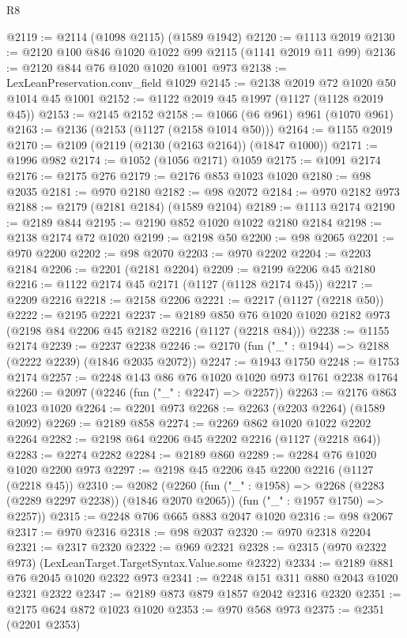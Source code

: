 \begin{lexlean}{R8}
\begin{coremodule}
@2119 := @2114 (@1098 @2115) (@1589 @1942)
@2120 := @1113 @2019
@2130 := @2120 @100 @846 @1020 @1022 @99 @2115 (@1141 @2019 @11 @99)
@2136 := @2120 @844 @76 @1020 @1020 @1001 @973
@2138 := LexLeanPreservation.conv_field @1029
@2145 := @2138 @2019 @72 @1020 @50 @1014 @45 @1001
@2152 := @1122 @2019 @45 @1997 (@1127 (@1128 @2019 @45))
@2153 := @2145 @2152
@2158 := @1066 (@6 @961) @961 (@1070 @961)
@2163 := @2136 (@2153 (@1127 (@2158 @1014 @50)))
@2164 := @1155 @2019
@2170 := @2109 (@2119 (@2130 (@2163 @2164)) (@1847 @1000))
@2171 := @1996 @982
@2174 := @1052 (@1056 @2171) @1059
@2175 := @1091 @2174
@2176 := @2175 @276
@2179 := @2176 @853 @1023 @1020
@2180 := @98 @2035
@2181 := @970 @2180
@2182 := @98 @2072
@2184 := @970 @2182 @973
@2188 := @2179 (@2181 @2184) (@1589 @2104)
@2189 := @1113 @2174
@2190 := @2189 @844
@2195 := @2190 @852 @1020 @1022 @2180 @2184
@2198 := @2138 @2174 @72 @1020
@2199 := @2198 @50
@2200 := @98 @2065
@2201 := @970 @2200
@2202 := @98 @2070
@2203 := @970 @2202
@2204 := @2203 @2184
@2206 := @2201 (@2181 @2204)
@2209 := @2199 @2206 @45 @2180
@2216 := @1122 @2174 @45 @2171 (@1127 (@1128 @2174 @45))
@2217 := @2209 @2216
@2218 := @2158 @2206
@2221 := @2217 (@1127 (@2218 @50))
@2222 := @2195 @2221
@2237 := @2189 @850 @76 @1020 @1020 @2182 @973 (@2198 @84 @2206 @45 @2182 @2216 (@1127 (@2218 @84)))
@2238 := @1155 @2174
@2239 := @2237 @2238
@2246 := @2170 (fun ("_" : @1944) => @2188 (@2222 @2239) (@1846 @2035 @2072))
@2247 := @1943 @1750
@2248 := @1753 @2174
@2257 := @2248 @143 @86 @76 @1020 @1020 @973 @1761 @2238 @1764
@2260 := @2097 (@2246 (fun ("_" : @2247) => @2257))
@2263 := @2176 @863 @1023 @1020
@2264 := @2201 @973
@2268 := @2263 (@2203 @2264) (@1589 @2092)
@2269 := @2189 @858
@2274 := @2269 @862 @1020 @1022 @2202 @2264
@2282 := @2198 @64 @2206 @45 @2202 @2216 (@1127 (@2218 @64))
@2283 := @2274 @2282
@2284 := @2189 @860
@2289 := @2284 @76 @1020 @1020 @2200 @973
@2297 := @2198 @45 @2206 @45 @2200 @2216 (@1127 (@2218 @45))
@2310 := @2082
    (@2260
      (fun ("_" : @1958) => @2268 (@2283 (@2289 @2297 @2238)) (@1846 @2070 @2065))
      (fun ("_" : @1957 @1750) => @2257))
@2315 := @2248 @706 @665 @883 @2047 @1020
@2316 := @98 @2067
@2317 := @970 @2316
@2318 := @98 @2037
@2320 := @970 @2318 @2204
@2321 := @2317 @2320
@2322 := @969 @2321
@2328 := @2315 (@970 @2322 @973) (LexLeanTarget.TargetSyntax.Value.some @2322)
@2334 := @2189 @881 @76 @2045 @1020 @2322 @973
@2341 := @2248 @151 @311 @880 @2043 @1020 @2321 @2322
@2347 := @2189 @873 @879 @1857 @2042 @2316 @2320
@2351 := @2175 @624 @872 @1023 @1020
@2353 := @970 @568 @973
@2375 := @2351
    (@2201 @2353)

\end{coremodule}
\end{lexlean}
